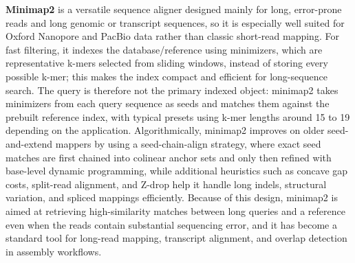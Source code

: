 \documentclass{article}
\begin{document}
\textbf{Minimap2} is a versatile sequence aligner designed mainly for long, error-prone reads and long genomic or transcript sequences, so it is especially well suited for Oxford Nanopore and PacBio data rather than classic short-read mapping. For fast filtering, it indexes the database/reference using minimizers, which are representative k-mers selected from sliding windows, instead of storing every possible k-mer; this makes the index compact and efficient for long-sequence search. The query is therefore not the primary indexed object: minimap2 takes minimizers from each query sequence as seeds and matches them against the prebuilt reference index, with typical presets using k-mer lengths around 15 to 19 depending on the application. Algorithmically, minimap2 improves on older seed-and-extend mappers by using a seed-chain-align strategy, where exact seed matches are first chained into colinear anchor sets and only then refined with base-level dynamic programming, while additional heuristics such as concave gap costs, split-read alignment, and Z-drop help it handle long indels, structural variation, and spliced mappings efficiently. Because of this design, minimap2 is aimed at retrieving high-similarity matches between long queries and a reference even when the reads contain substantial sequencing error, and it has become a standard tool for long-read mapping, transcript alignment, and overlap detection in assembly workflows.
\end{document}
